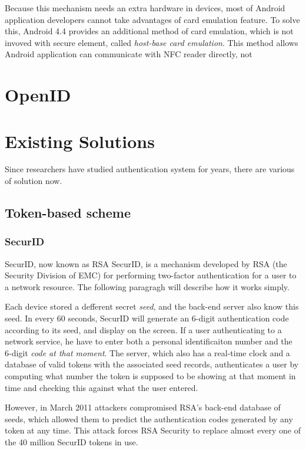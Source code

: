 \begin{CJK}{Bg5}{bsmi}
Because this mechanism needs an extra hardware in devices, most of Android application developers cannot take advantages of card emulation feature. To solve this, Android 4.4 provides an additional method of card emulation, which is not invoved with secure element, called \emph{host-base card emulation}. This method allows Android application can communicate with NFC reader directly, not 

\section{OpenID}

\section{Existing Solutions}

Since researchers have studied authentication system for years, there are various of solution now. 

\subsection{Token-based scheme}

\subsubsection{SecurID}

SecurID, now known as RSA SecurID, is a mechanism developed by RSA (the Security Division of EMC) for performing two-factor authentication for a user to a network resource. The following paragragh will describe how it works simply.

Each device stored a defferent secret \emph{seed}, and the back-end server also know this seed. In every 60 seconds, SecurID will generate an 6-digit authentication code according to its seed, and display on the screen. If a user authenticating to a network service, he have to enter both a personal identificaiton number and the 6-digit \emph{code at that moment}. The server, which also has a real-time clock and a database of valid tokens with the associated seed records, authenticates a user by computing what number the token is supposed to be showing at that moment in time and checking this against what the user entered.

However, in March 2011 attackers compromised RSA's back-end database of seeds, which allowed them to predict the authentication codes generated by any token at any time. This attack forces RSA Security to replace almost every one of the 40 million SecurID tokens in use.


\end{CJK}
